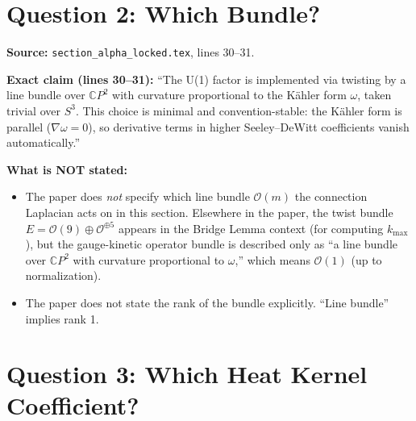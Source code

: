 \documentclass[12pt,a4paper]{article}
\begin{document}
\section{Question 2: Which Bundle?}
\label{sec:q2}

\begin{tcolorbox}[colback=yellow!5!white, colframe=yellow!50!black,
  title=Answer: LINE BUNDLE over CP2 with Kaehler curvature; TRIVIAL over S3]

\textbf{Source:} \texttt{section\_alpha\_locked.tex}, lines 30--31.

\textbf{Exact claim (lines 30--31):}
``The U(1) factor is implemented via twisting by a line bundle over
$\mathbb{C}P^2$ with curvature proportional to the K\"ahler form $\omega$,
taken trivial over $S^3$. This choice is minimal and convention-stable:
the K\"ahler form is parallel ($\nabla\omega = 0$), so derivative terms
in higher Seeley--DeWitt coefficients vanish automatically.''

\textbf{What is NOT stated:}
\begin{itemize}
\item The paper does \emph{not} specify which line bundle $\mathcal{O}(m)$
  the connection Laplacian acts on in this section.  Elsewhere in the paper,
  the twist bundle $E = \mathcal{O}(9) \oplus \mathcal{O}^{\oplus 5}$ appears
  in the Bridge Lemma context (for computing $k_{\max}$), but the gauge-kinetic
  operator bundle is described only as ``a line bundle over $\mathbb{C}P^2$
  with curvature proportional to $\omega$,'' which means $\mathcal{O}(1)$
  (up to normalization).
\item The paper does not state the rank of the bundle explicitly.
  ``Line bundle'' implies rank 1.
\end{itemize}
\end{tcolorbox}

\section{Question 3: Which Heat Kernel Coefficient?}
\label{sec:q3}
\end{document}

